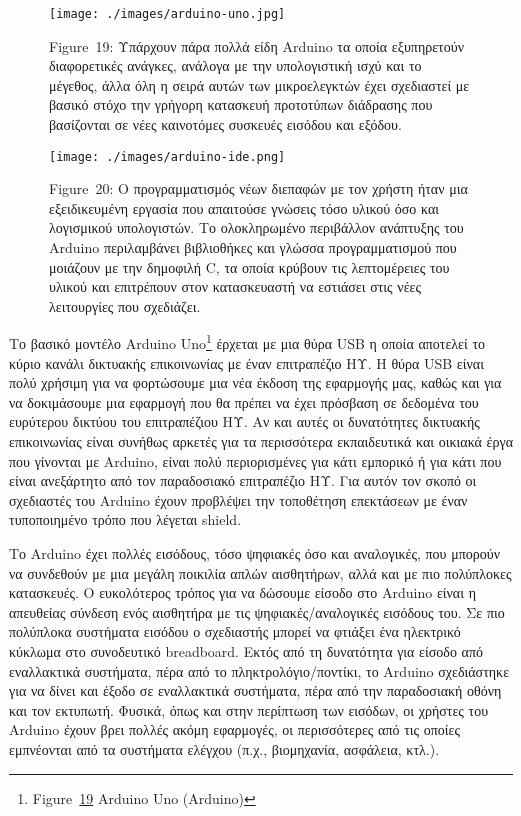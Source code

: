 \documentclass[
]{article}
\begin{document}
\leavevmode{}%
\begin{figure}
\hypertarget{fig:arduino-uno}{%
\centering
\texttt{[image: ./images/arduino-uno.jpg]}
\caption{Figure~19: Υπάρχουν πάρα πολλά είδη Arduino τα οποία
εξυπηρετούν διαφορετικές ανάγκες, ανάλογα με την υπολογιστική ισχύ και
το μέγεθος, άλλα όλη η σειρά αυτών των μικροελεγκτών έχει σχεδιαστεί με
βασικό στόχο την γρήγορη κατασκευή προτοτύπων διάδρασης που βασίζονται
σε νέες καινοτόμες συσκευές εισόδου και εξόδου.}\label{fig:arduino-uno}
}
\end{figure}

\leavevmode{}%
\begin{figure}
\hypertarget{fig:arduino-ide}{%
\centering
\texttt{[image: ./images/arduino-ide.png]}
\caption{Figure~20: Ο προγραμματισμός νέων διεπαφών με τον χρήστη ήταν
μια εξειδικευμένη εργασία που απαιτούσε γνώσεις τόσο υλικού όσο και
λογισμικού υπολογιστών. Το ολοκληρωμένο περιβάλλον ανάπτυξης του Arduino
περιλαμβάνει βιβλιοθήκες και γλώσσα προγραμματισμού που μοιάζουν με την
δημοφιλή C, τα οποία κρύβουν τις λεπτομέρειες του υλικού και επιτρέπουν
στον κατασκευαστή να εστιάσει στις νέες λειτουργίες που
σχεδιάζει.}\label{fig:arduino-ide}
}
\end{figure}

Το βασικό μοντέλο Arduino Uno\footnote{Figure~\protect\hyperlink{fig:arduino-uno}{19}
  Arduino Uno (Arduino)} έρχεται με μια θύρα USB η οποία αποτελεί το
κύριο κανάλι δικτυακής επικοινωνίας με έναν επιτραπέζιο ΗΥ. Η θύρα USB
είναι πολύ χρήσιμη για να φορτώσουμε μια νέα έκδοση της εφαρμογής μας,
καθώς και για να δοκιμάσουμε μια εφαρμογή που θα πρέπει να έχει πρόσβαση
σε δεδομένα του ευρύτερου δικτύου του επιτραπέζιου ΗΥ. Αν και αυτές οι
δυνατότητες δικτυακής επικοινωνίας είναι συνήθως αρκετές για τα
περισσότερα εκπαιδευτικά και οικιακά έργα που γίνονται με Arduino, είναι
πολύ περιορισμένες για κάτι εμπορικό ή για κάτι που είναι ανεξάρτητο από
τον παραδοσιακό επιτραπέζιο ΗΥ. Για αυτόν τον σκοπό οι σχεδιαστές του
Arduino έχουν προβλέψει την τοποθέτηση επεκτάσεων με έναν τυποποιημένο
τρόπο που λέγεται shield.

Το Arduino έχει πολλές εισόδους, τόσο ψηφιακές όσο και αναλογικές, που
μπορούν να συνδεθούν με μια μεγάλη ποικιλία απλών αισθητήρων, αλλά και
με πιο πολύπλοκες κατασκευές. Ο ευκολότερος τρόπος για να δώσουμε είσοδο
στο Arduino είναι η απευθείας σύνδεση ενός αισθητήρα με τις
ψηφιακές/αναλογικές εισόδους του. Σε πιο πολύπλοκα συστήματα εισόδου ο
σχεδιαστής μπορεί να φτιάξει ένα ηλεκτρικό κύκλωμα στο συνοδευτικό
breadboard. Εκτός από τη δυνατότητα για είσοδο από εναλλακτικά
συστήματα, πέρα από το πληκτρολόγιο/ποντίκι, το Arduino σχεδιάστηκε για
να δίνει και έξοδο σε εναλλακτικά συστήματα, πέρα από την παραδοσιακή
οθόνη και τον εκτυπωτή. Φυσικά, όπως και στην περίπτωση των εισόδων, οι
χρήστες του Arduino έχουν βρει πολλές ακόμη εφαρμογές, οι περισσότερες
από τις οποίες εμπνέονται από τα συστήματα ελέγχου (π.χ., βιομηχανία,
ασφάλεια, κτλ.).
\end{document}
